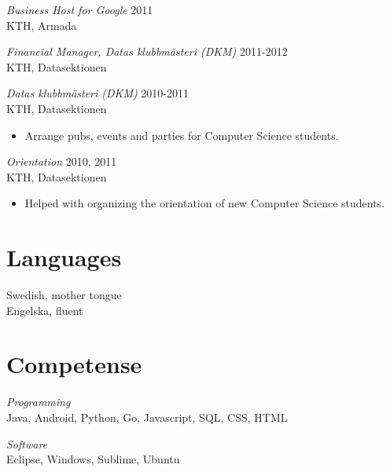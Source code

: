 \documentclass[margin, 10pt]{res} %
\begin{document}
\begin{resume}
{\sl Business Host for Google} \hfill 2011 \\
KTH, Armada

{\sl Financial Manager, Datas klubbmästeri (DKM)} \hfill 2011-2012 \\
KTH, Datasektionen

{\sl Datas klubbmästeri (DKM)} \hfill 2010-2011 \\
KTH, Datasektionen
\begin{itemize} 
\item Arrange pubs, events and parties for Computer Science students.
\end{itemize}

{\sl Orientation} \hfill 2010, 2011 \\
KTH, Datasektionen
\begin{itemize} 
\item Helped with organizing the orientation of new Computer Science students.
\end{itemize}


\section{Languages}
Swedish, mother tongue \\
Engelska, fluent


\section{Competense}
{\sl Programming} \\
Java, Android, Python, Go, Javascript, SQL, CSS, HTML

{\sl Software} \\
Eclipse, Windows, Sublime, Ubuntu


\end{resume}
\end{document}
